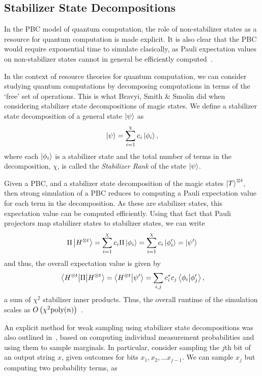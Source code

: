 \subsection{Stabilizer State Decompositions}\label{sec:pbc_decomposition}
In the PBC model of quantum computation, the role of non-stabilizer states as a resource for quantum computation is made explicit. It is also clear that the PBC would require exponential time to simulate clasically, as Pauli expectation values on non-stabilizer states cannot in general be efficiently computed~\cite{Gottesman1998b}.\par
In the context of resource theories for quantum computation, we can consider studying quantum computations by decomposing computations in terms of the `free' set of operations. This is what Bravyi, Smith \& Smolin did when considering stabilizer state decompositions of magic states. We define a stabilizer state decomposition of a general state $\ket{\psi}$ as
\begin{equation}
\ket{\psi} = \sum_{i=1}^{\chi}c_{i}\ket{\phi_{i}},
\label{eq:stab_state_decomposition}
\end{equation}
where each $\ket{\phi_{i}}$ is a stabilizer state and the total number of terms in the decomposition, $\chi$, is called the \emph{Stabilizer Rank} of the state $\ket{\psi}$.\par
Given a PBC, and a stabilizer state decomposition of the magic states $\ket{T}^{\otimes t}$, then strong simulation of a PBC reduces to computing a Pauli expectation value for each term in the decomposition. As these are stabilizer states, this expectation value can be computed efficiently. Using that fact that Pauli projectors map stabilizer states to stabilizer states, we can write
\[\Pi\ket{H^{\otimes t}} = \sum_{i=1}^{\chi}c_{i}\Pi\ket{\phi_{i}}=\sum_{i=1}^{\chi}c_{i}\ket{\phi_{i}'}=\ket{\psi'}\]
and thus, the overall expectation value is given by
\begin{equation}
\matrixel{H^{\otimes t}}{\Pi}{H^{\otimes t}} = \braket{H^{\otimes t}}{\psi'} = \sum_{i,j}c_{i}^{*}c_{j}\braket{\phi_{i}}{\phi'_{j}},
\end{equation}
a sum of $\chi^{2}$ stabilizer inner products. Thus, the overall runtime of the simulation scales as $O\left(\chi^{2}\text{poly}(n)\right)$~\cite{Bravyi2015}.\par
An explicit method for weak sampling using stabilizer state decompositions was also outlined in~\cite{Bravyi2015}, based on computing individual measurement probabilities and using them to sample marginals. In particular, consider sampling the $j$th bit of an output string $x$, given outcomes for bits $x_{1},x_{2},\dots x_{j-1}$. We can sample $x_{j}$ but computing two probability terms, as~\cite{Bravyi2016}

